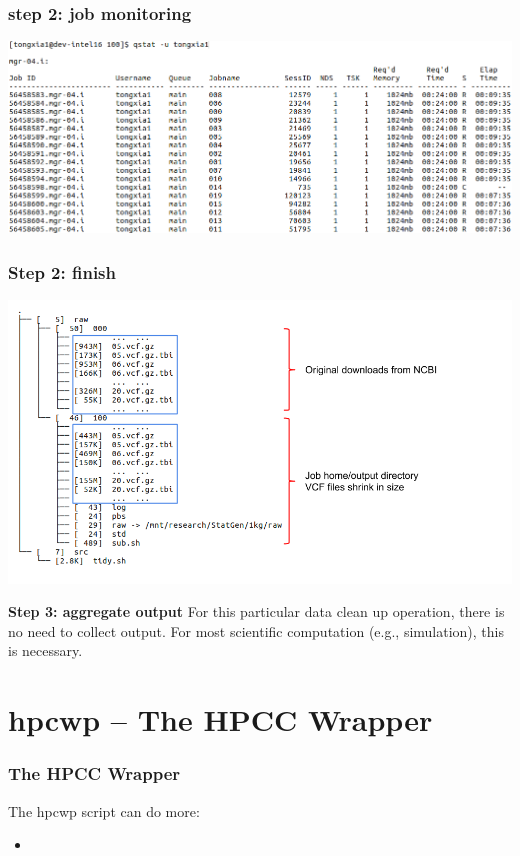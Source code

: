 \documentclass{beamer}
\begin{document}
\begin{frame}
  \frametitle{step 2: job monitoring}
  \includegraphics[width=1.0\linewidth]{img/step_2_c}
\end{frame}
\begin{frame}
  \frametitle{Step 2: finish}
  \includegraphics[width=1.0\linewidth]{img/step_2_d}
\end{frame}

\begin{frame}
\textbf{Step 3: aggregate output}
For this particular data clean up operation, there is no need to collect output. For most scientific
computation (e.g., simulation), this is necessary.
\end{frame}

\section{hpcwp -- The HPCC Wrapper}
\begin{frame}
  \frametitle{The HPCC Wrapper}
  The hpcwp script can do more:
  \begin{itemize}
  \item 
  \end{itemize}
\end{frame}
\end{document}
